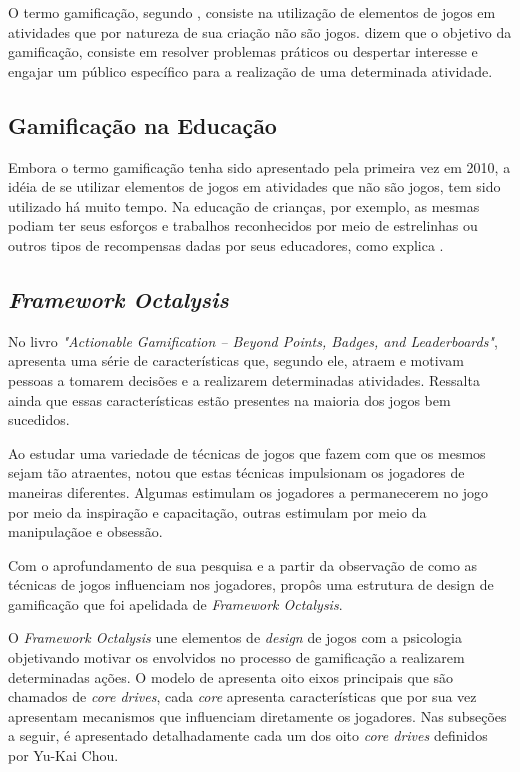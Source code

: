 O termo gamificação, segundo , consiste na utilização de elementos de jogos em 
atividades que por natureza de sua criação não são jogos.  dizem que o objetivo da gamificação, consiste em resolver
problemas práticos ou despertar interesse e engajar um público específico para a realização de uma determinada
atividade. 

\subsection{Gamificação na Educação}
Embora o termo gamificação tenha sido apresentado pela primeira vez em 2010, a idéia de se utilizar
elementos de jogos em atividades que não são jogos, tem sido utilizado há muito tempo. Na educação
de crianças, por exemplo, as mesmas podiam ter seus esforços e trabalhos reconhecidos por meio
de estrelinhas ou outros tipos de recompensas dadas por seus educadores, como explica .

\subsection{\textit{Framework Octalysis}}
No livro \textit{"Actionable Gamification – Beyond Points, Badges, and Leaderboards"},  apresenta uma série
de características que, segundo ele, atraem e motivam pessoas a tomarem decisões e a realizarem determinadas atividades.
Ressalta ainda que essas características estão presentes na maioria dos jogos bem sucedidos.

Ao estudar uma variedade de técnicas de jogos que fazem com que os mesmos sejam tão atraentes,  notou que estas 
técnicas impulsionam os jogadores de maneiras diferentes. Algumas estimulam os jogadores a permanecerem no jogo por meio da
inspiração e capacitação, outras estimulam por meio da manipulaçãoe e obsessão.

Com o aprofundamento de sua pesquisa e a partir da observação de como as técnicas de jogos influenciam nos jogadores,  
propôs uma estrutura de design de gamificação que foi apelidada de  \textit{Framework Octalysis}.

O \textit{Framework Octalysis} une elementos de \textit{design} de jogos com a psicologia objetivando motivar os envolvidos
no processo de gamificação a realizarem determinadas ações. O modelo de  apresenta oito eixos principais que 
são chamados de \textit{core drives}, cada \textit{core} apresenta características que por sua vez apresentam mecanismos que
influenciam diretamente os jogadores. Nas subseções a seguir, é apresentado detalhadamente cada um dos oito \textit{core drives}
definidos por Yu-Kai Chou.

